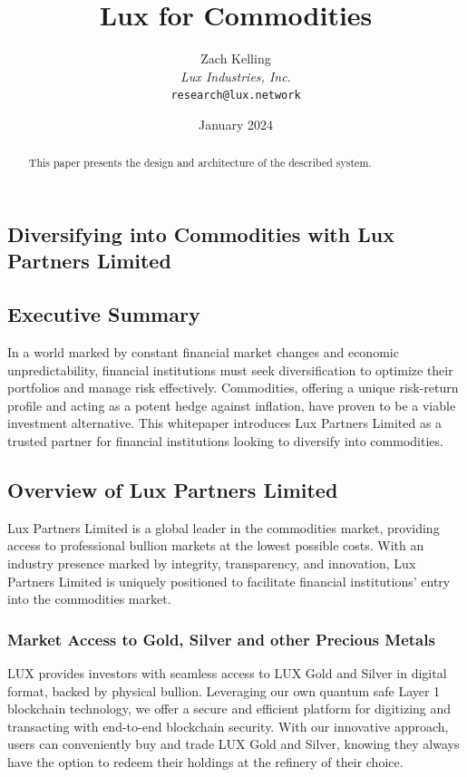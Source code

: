 \documentclass[11pt]{article}
\title{Lux for Commodities}
\author{Zach Kelling\\\textit{Lux Industries, Inc.}\\\texttt{research@lux.network}}
\date{January 2024}
\begin{document}
\luxcoverpage

\begin{abstract}
This paper presents the design and architecture of the described system.
\end{abstract}

\tableofcontents
\newpage


\subsection{Diversifying into Commodities with Lux Partners Limited}

\subsection{Executive Summary}

In a world marked by constant financial market changes and economic unpredictability, financial institutions must seek diversification to optimize their portfolios and manage risk effectively. Commodities, offering a unique risk-return profile and acting as a potent hedge against inflation, have proven to be a viable investment alternative. This whitepaper introduces Lux Partners Limited as a trusted partner for financial institutions looking to diversify into commodities.


\subsection{Overview of Lux Partners Limited}

Lux Partners Limited is a global leader in the commodities market, providing access to professional bullion markets at the lowest possible costs. With an industry presence marked by integrity, transparency, and innovation, Lux Partners Limited is uniquely positioned to facilitate financial institutions' entry into the commodities market.


\subsubsection{Market Access to Gold, Silver and other Precious Metals}

LUX provides investors with seamless access to LUX Gold and Silver in digital format, backed by physical bullion. Leveraging our own quantum safe Layer 1 blockchain technology, we offer a secure and efficient platform for digitizing and transacting with end-to-end blockchain security. With our innovative approach, users can conveniently buy and trade LUX Gold and Silver, knowing they always have the option to redeem their holdings at the refinery of their choice.
\end{document}

